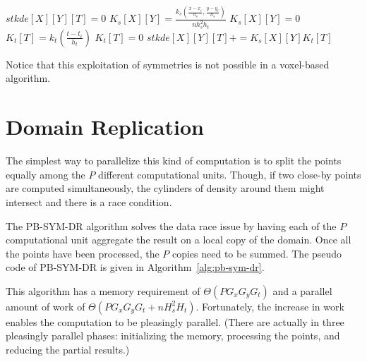 \documentclass{article}
\begin{document}
\begin{algorithm}
\caption{\textsc{PB-SYM}}
\begin{algorithmic}
  \State $stkde[X][Y][T] = 0$
\EndFor
%
        \State $K_s[X][Y] = \frac{k_s(\frac{x-x_i}{h_s},\frac{y-y_i}{h_s})}{n h_s^2h_t}$
      \Else
        \State $K_s[X][Y] = 0$
      \EndIf
    \EndFor
  \EndFor
      \State $K_t[T] = k_t(\frac{t-t_i}{h_t})$
    \Else
      \State $K_t[T] = 0$
    \EndIf
  \EndFor
%
        \State $stkde[X][Y][T] +=  K_s[X][Y] K_t[T]$
      \EndFor
    \EndFor
  \EndFor
\EndFor
\end{algorithmic}
\label{alg:pb-sym}
\end{algorithm}

Notice that this exploitation of symmetries is not possible in a
voxel-based algorithm.



\section{Domain Replication}

\label{sec:algo-pb-dr}


The simplest way to parallelize this kind of computation is to split
the points equally among the $P$ different computational
units. Though, if two close-by points are computed
simultaneously, the cylinders of density around them might intersect and
there is a race condition.

The PB-SYM-DR algorithm solves the data race issue by having each of
the $P$ computational unit aggregate the result on a local copy of the
domain. Once all the points have been processed, the $P$ copies need
to be summed. The pseudo code of PB-SYM-DR is given in
Algorithm~\ref{alg:pb-sym-dr}.

This algorithm has a memory requirement of $\Theta (P  G_x  G_y  G_t)$
and a parallel amount of work of $\Theta (P  G_x  G_y  G_t + n  H_s^2
 H_t)$. Fortunately, the increase in work enables the computation to be
pleasingly parallel. (There are actually in three pleasingly parallel phases:
initializing the memory, processing the points, and reducing the partial results.)
\end{document}
